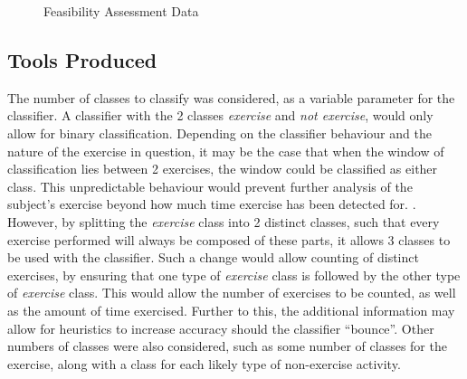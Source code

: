 \begin{figure}
	\centering
	\caption{Feasibility Assessment Data \label{fig:first-data}}
\end{figure}

\subsection{Tools Produced \label{sec:tools-produced}}

The number of classes to classify was considered, as a variable parameter for the classifier. A classifier with the 2 classes \textit{exercise}  and \textit{not exercise}, would only allow for binary classification. Depending on the classifier behaviour and the nature of the exercise in question, it may be the case that when the window of classification lies between 2 exercises, the window could be classified as either class. This unpredictable behaviour would prevent further analysis of the subject's exercise beyond how much time exercise has been detected for. . However, by splitting the \textit{exercise} class into 2 distinct classes, such that every exercise performed will always be composed of these parts, it allows 3 classes to be used with the classifier. Such a change would allow counting of distinct exercises, by ensuring that one type of \textit{exercise} class is followed by the other type of \textit{exercise} class. This would allow the number of exercises to be counted, as well as the amount of time exercised. Further to this, the additional information may allow for heuristics to increase accuracy should the classifier ``bounce''.  Other numbers of classes were also considered, such as some number of classes for the exercise, along with a class for each likely type of non-exercise activity. 


